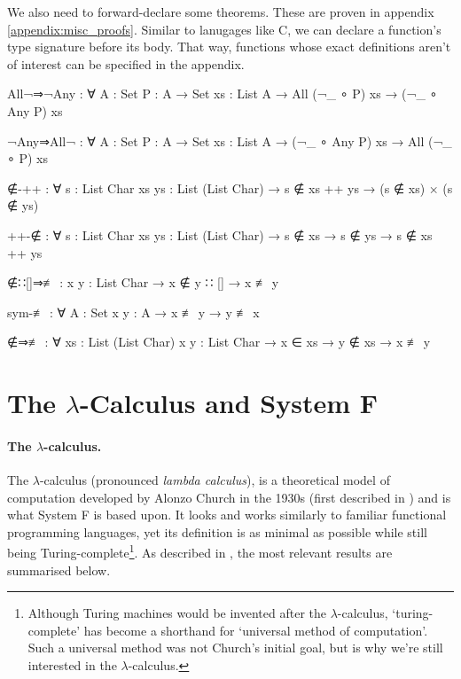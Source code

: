 \documentclass[logo,bsc,singlespacing,parskip,online]{infthesis}
\renewenvironment{code}{\mintedcopy[breaklines,breaksymbolleft=\;]{agda}}{\endmintedcopy}
\begin{document}
\begin{comment}
-- Import list membership using List Char comparisons.
_≟lchar_ : ∀ (xs ys : List Char) → Dec (xs ≡ ys)
xs ≟lchar ys = ≡-dec (_≟char_) xs ys

open DecPropMembership _≟lchar_ using (_∈_; _∉_; _∈?_)
\end{code}

Include some infixes.

\begin{code}
infix  4  _∋_⦂_
infix  4 _⊢_⦂_
infixl 5 _,_⦂_

infixr 7 _⇒_

infix  5 ƛ_
infixl 7 _·_
infix  9 free_
infix  9 bound_

infix 4 _—→_
\end{code}
\end{comment}

We also need to forward-declare some theorems. These are proven in appendix
\ref{appendix:misc_proofs}. Similar to lanugages like C, we can declare a function's type signature
before its body. That way, functions whose exact definitions aren't of interest can be specified
in the appendix.

\begin{code}
All¬⇒¬Any : ∀ {A : Set} {P : A → Set} {xs : List A}
  → All (¬_ ∘ P) xs → (¬_ ∘ Any P) xs

¬Any⇒All¬ : ∀ {A : Set} {P : A → Set} {xs : List A}
  → (¬_ ∘ Any P) xs → All (¬_ ∘ P) xs

∉-++ : ∀ {s : List Char} {xs ys : List (List Char)}
  → s ∉ xs ++ ys → (s ∉ xs) × (s ∉ ys)

++-∉ : ∀ {s : List Char} {xs ys : List (List Char)}
  → s ∉ xs → s ∉ ys → s ∉ xs ++ ys

∉∷[]⇒≢ : {x y : List Char} → x ∉ y ∷ [] → x ≢ y

sym-≢ : ∀ {A : Set} {x y : A}
  → x ≢ y → y ≢ x

∉⇒≢ : ∀ {xs : List (List Char)} {x y : List Char}
  → x ∈ xs → y ∉ xs → x ≢ y
\end{code}

\section{The $\lambda$-Calculus and System F}

\paragraph*{The $\lambda$-calculus.} The $\lambda$-calculus (pronounced
\textit{lambda calculus}), is a theoretical model of computation developed by
Alonzo Church in the 1930s (first described in \citet{church_set_1932}) and is
what System F is based upon. It looks and works similarly to familiar functional
programming languages, yet its definition is as minimal as possible while still
being Turing-complete\footnote{Although Turing machines would be invented after
the $\lambda$-calculus, `turing-complete' has become a shorthand for `universal
method of computation'. Such a universal method was not Church's initial goal,
but is why we're still interested in the $\lambda$-calculus.}. As described in
\cite{pierce_types_2002}, the most relevant results are summarised below.
\end{document}
